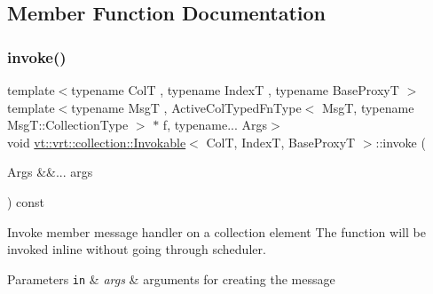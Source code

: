 \subsection{Member Function Documentation}
\mbox{\label{structvt_1_1vrt_1_1collection_1_1_invokable_ab7ad9b74cbf75b0f1df13e0cc88311b7}} 
\subsubsection{\texorpdfstring{invoke()}{invoke()}\hspace{0.1cm}{\footnotesize\ttfamily [1/3]}}
{\footnotesize\ttfamily template$<$typename ColT , typename IndexT , typename Base\+ProxyT $>$ \\
template$<$typename MsgT , Active\+Col\+Typed\+Fn\+Type$<$ Msg\+T, typename Msg\+T\+::\+Collection\+Type $>$ $\ast$ f, typename... Args$>$ \\
void \hyperlink{structvt_1_1vrt_1_1collection_1_1_invokable}{vt\+::vrt\+::collection\+::\+Invokable}$<$ ColT, IndexT, Base\+ProxyT $>$\+::invoke (\begin{DoxyParamCaption}\item[{Args \&\&...}]{args }\end{DoxyParamCaption}) const}



Invoke member message handler on a collection element The function will be invoked inline without going through scheduler. 


\begin{DoxyParams}[1]{Parameters}
\mbox{\tt in}  & {\em args} & arguments for creating the message \\
\hline
\end{DoxyParams}
\mbox{\label{structvt_1_1vrt_1_1collection_1_1_invokable_ab7ad9b74cbf75b0f1df13e0cc88311b7}} 
